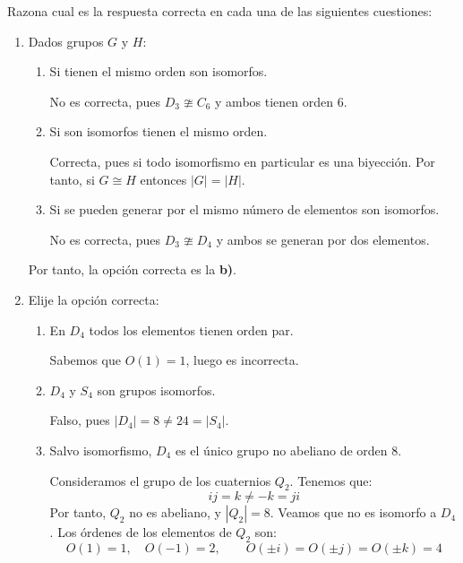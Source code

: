 \documentclass[12pt]{article}
\begin{document}
    \begin{ejercicio}
        Razona cual es la respuesta correcta en cada una de las siguientes cuestiones:
        \begin{enumerate}
            \item Dados grupos $G$ y $H$:
            \begin{enumerate}
                \item Si tienen el mismo orden son isomorfos.
                
                No es correcta, pues $D_3\ncong C_6$ y ambos tienen orden 6.
                \item Si son isomorfos tienen el mismo orden.
                
                Correcta, pues si todo isomorfismo en particular es una biyección. Por tanto, si $G\cong H$ entonces $|G|=|H|$.
                \item Si se pueden generar por el mismo número de elementos son isomorfos.
                
                No es correcta, pues $D_3\ncong D_4$ y ambos se generan por dos elementos.
            \end{enumerate}
            
            Por tanto, la opción correcta es la \textbf{b)}.
            \item Elije la opción correcta:
            \begin{enumerate}
                \item En $D_4$ todos los elementos tienen orden par.
                
                Sabemos que $O(1)=1$, luego es incorrecta.
                \item $D_4$ y $S_4$ son grupos isomorfos.
                
                Falso, pues $|D_4|=8\neq 24=|S_4|$.
                \item Salvo isomorfismo, $D_4$ es el único grupo no abeliano de orden 8.
                
                Consideramos el grupo de los cuaternios $Q_2$. Tenemos que:
                \begin{equation*}
                    ij=k\neq -k=ji
                \end{equation*}
                Por tanto, $Q_2$ no es abeliano, y $|Q_2|=8$. Veamos que no es isomorfo a $D_4$. Los órdenes de los elementos de $Q_2$ son:
                \begin{equation*}
                    O(1)=1,\quad O(-1)=2,\qquad O(\pm i)=O(\pm j)=O(\pm k)=4
                \end{equation*}


\end{enumerate}
\end{enumerate}
\end{ejercicio}
\end{document}
